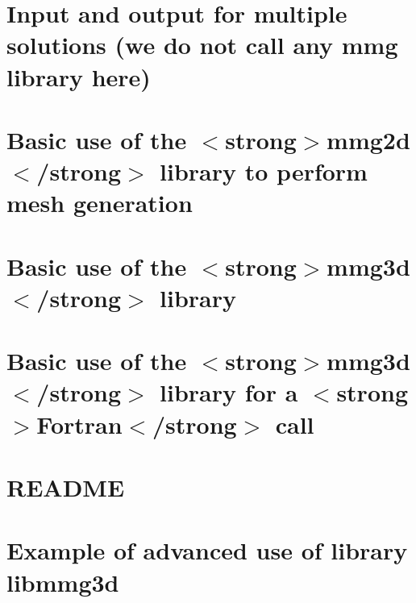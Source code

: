 \documentclass[twoside]{book}
\newcommand{\+}{\discretionary{\mbox{\scriptsize$\hookleftarrow$}}{}{}}
\begin{document}
\chapter{Input and output for multiple solutions (we do not call any mmg library here)}
\label{md_libexamples_mmg2d_io_multisols_example0_README}

\chapter{Basic use of the \texorpdfstring{$<$}{<}strong\texorpdfstring{$>$}{>}mmg2d\texorpdfstring{$<$}{<}/strong\texorpdfstring{$>$}{>} library to perform mesh generation}
\label{md_libexamples_mmg2d_squareGeneration_example0_README}

\chapter{Basic use of the \texorpdfstring{$<$}{<}strong\texorpdfstring{$>$}{>}mmg3d\texorpdfstring{$<$}{<}/strong\texorpdfstring{$>$}{>} library}
\label{md_libexamples_mmg3d_adaptation_example0_README}

\chapter{Basic use of the \texorpdfstring{$<$}{<}strong\texorpdfstring{$>$}{>}mmg3d\texorpdfstring{$<$}{<}/strong\texorpdfstring{$>$}{>} library for a \texorpdfstring{$<$}{<}strong\texorpdfstring{$>$}{>}Fortran\texorpdfstring{$<$}{<}/strong\texorpdfstring{$>$}{>} call}
\label{md_libexamples_mmg3d_adaptation_example0_fortran_README}

\chapter{README}
\label{md_libexamples_mmg3d_adaptation_example1_README}

\chapter{Example of advanced use of library libmmg3d}
\label{md_libexamples_mmg3d_adaptation_example2_README}

\end{document}
